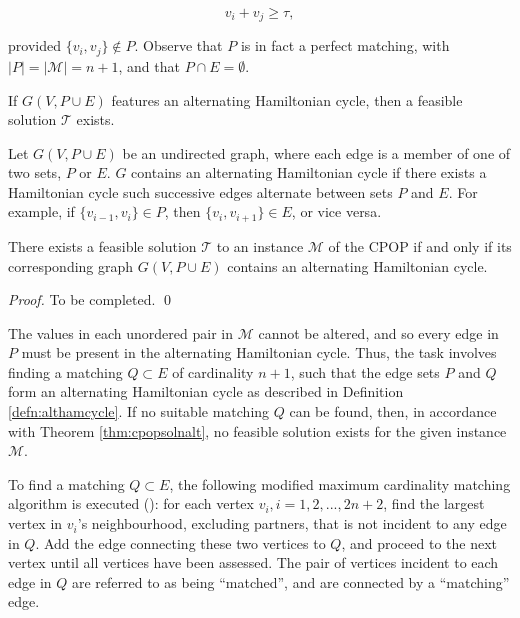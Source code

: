 \documentclass[oribibl]{llncs}
\begin{document}
\begin{equation}
	\label{eqn:jointsum}
	v_i + v_j \geq \tau,
\end{equation}

provided $\{v_i, v_j\} \notin P$. Observe that $P$ is in fact a perfect matching, with $|P| = |\mathcal{M}| = n+1$, and that $P \cap E = \emptyset$.

If $G(V, P\cup E)$ features an alternating Hamiltonian cycle, then a feasible solution $\mathcal{T}$ exists.

\begin{definition}
	\label{defn:althamcycle}
	Let $G(V, P\cup E)$ be an undirected graph, where each edge is a member of one of two sets, $P$ or $E$. $G$ contains an alternating Hamiltonian cycle if there exists a Hamiltonian cycle such successive edges alternate between sets $P$ and $E$. For example, if $\{v_{i-1}, v_i\} \in P$, then $\{v_i, v_{i+1}\} \in E$, or vice versa.
\end{definition}

\begin{theorem}
	\label{thm:cpopsolnalt}
	There exists a feasible solution $\mathcal{T}$ to an instance $\mathcal{M}$ of the CPOP if and only if its corresponding graph $G(V, P\cup E)$ contains an alternating Hamiltonian cycle.
\end{theorem}
\begin{proof}
	To be completed. \qed
\end{proof}

The values in each unordered pair in $\mathcal{M}$ cannot be altered, and so every edge in $P$ must be present in the alternating Hamiltonian cycle. Thus, the task involves finding a matching $Q \subset E$ of cardinality $n+1$, such that the edge sets $P$ and $Q$ form an alternating Hamiltonian cycle as described in Definition \ref{defn:althamcycle}. If no suitable matching $Q$ can be found, then, in accordance with Theorem \ref{thm:cpopsolnalt}, no feasible solution exists for the given instance $\mathcal{M}$.

To find a matching $Q \subset E$, the following modified maximum cardinality matching algorithm is executed (\citealp{mahadev1994, becker2010}): for each vertex $v_i, i = 1, 2,...,2n+2$, find the largest vertex in $v_i$'s neighbourhood, excluding partners, that is not incident to any edge in $Q$. Add the edge connecting these two vertices to $Q$, and proceed to the next vertex until all vertices have been assessed. The pair of vertices incident to each edge in $Q$ are referred to as being ``matched'', and are connected by a ``matching'' edge. 
\end{document}
